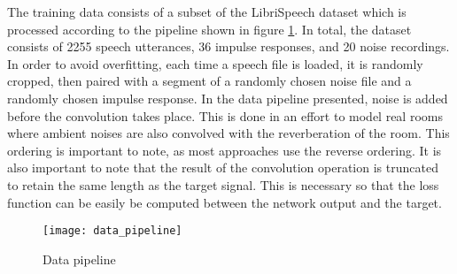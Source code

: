 The training data consists of a subset of the LibriSpeech dataset \cite{panayotov_librispeech_2015} which is processed according to the pipeline shown in figure \ref{fig:data_pipeline}. In total, the dataset consists of 2255 speech utterances, 36 impulse responses, and 20 noise recordings. In order to avoid overfitting, each time a speech file is loaded, it is randomly cropped, then paired with a segment of a randomly chosen noise file and a randomly chosen impulse response. In the data pipeline presented, noise is added before the convolution takes place. This is done in an effort to model real rooms where ambient noises are also convolved with the reverberation of the room. This ordering is important to note, as most approaches use the reverse ordering.	It is also important to note that the result of the convolution operation is truncated to retain the same length as the target signal. This is necessary so that the loss function can be easily be computed between the network output and the target.

\begin{figure}[h]
	\centering
	\texttt{[image: data\_pipeline]}
	\caption{Data pipeline}
	\label{fig:data_pipeline}
\end{figure}
